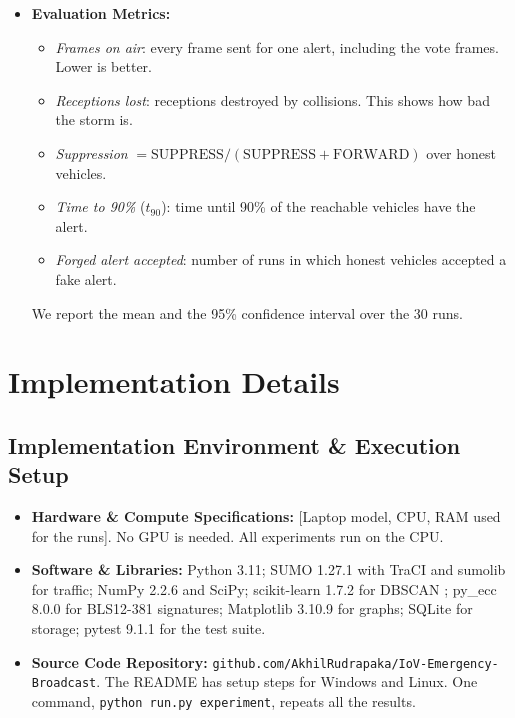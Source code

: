 \documentclass[11pt, a4paper]{article}
\begin{document}
\begin{itemize}[noitemsep, topsep=2pt]
    \item \textbf{Evaluation Metrics:}
    \begin{itemize}[noitemsep, topsep=1pt]
        \item \emph{Frames on air}: every frame sent for one alert, including the vote frames. Lower is better.
        \item \emph{Receptions lost}: receptions destroyed by collisions. This shows how bad the storm is.
        \item \emph{Suppression} $= \mathrm{SUPPRESS} / (\mathrm{SUPPRESS} + \mathrm{FORWARD})$ over honest vehicles.
        \item \emph{Time to 90\%} ($t_{90}$): time until 90\% of the reachable vehicles have the alert.
        \item \emph{Forged alert accepted}: number of runs in which honest vehicles accepted a fake alert.
    \end{itemize}
    We report the mean and the 95\% confidence interval over the 30 runs.
\end{itemize}

\section{Implementation Details}

\subsection{Implementation Environment \& Execution Setup}
\begin{itemize}[noitemsep, topsep=2pt]
    \item \textbf{Hardware \& Compute Specifications:} [Laptop model, CPU, RAM used for the runs]. No GPU is needed. All experiments run on the CPU.
    \item \textbf{Software \& Libraries:} Python 3.11; SUMO 1.27.1 with TraCI and sumolib for traffic; NumPy 2.2.6 and SciPy; scikit-learn 1.7.2 for DBSCAN \cite{ester1996}; py\_ecc 8.0.0 for BLS12-381 signatures; Matplotlib 3.10.9 for graphs; SQLite for storage; pytest 9.1.1 for the test suite.
    \item \textbf{Source Code Repository:} \texttt{github.com/AkhilRudrapaka/IoV-Emergency-Broadcast}. The README has setup steps for Windows and Linux. One command, \texttt{python run.py experiment}, repeats all the results.
\end{itemize}
\end{document}
